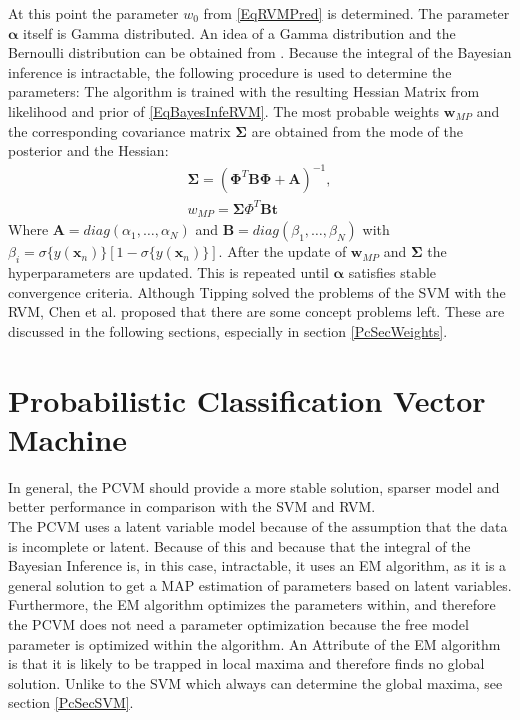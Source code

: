 At this point the parameter $w_0$ from \eqref{EqRVMPred} is determined.
The parameter $\boldsymbol{\alpha}$ itself is Gamma distributed.\cite[p. 214-215, 218-219]{Tipping.2001}\newline
An idea of a Gamma distribution and the Bernoulli distribution can be obtained from \cite[p.686-688]{Bishop.2009}.\newline
Because the integral of the Bayesian inference is intractable, the following procedure is used to determine the parameters:
The algorithm is trained with the resulting Hessian Matrix from likelihood and prior of \ref{EqBayesInfeRVM}.
The most probable weights $\mathbf{w}_{MP}$ and the corresponding covariance matrix $\boldsymbol{\Sigma}$ are obtained from the mode of the posterior and the Hessian:
\begin{equation}
\begin{split}
\boldsymbol{\Sigma} = (\boldsymbol{\Phi}^T\mathbf{B}\boldsymbol{\Phi} + \mathbf{A})^{-1},\\
w_{MP}=\boldsymbol{\Sigma}\Phi^T\mathbf{B}\mathbf{t} 
\end{split}
\end{equation}
Where $\mathbf{A} = diag(\alpha_1,\dots,\alpha_N)$ and $\mathbf{B} = diag(\beta_1,\dots,\beta_N)$ with $\beta_i =\sigma\{y(\mathbf{x}_n)\}[1-\sigma\{y(\mathbf{x}_n)\}]$.
After the update of $\mathbf{w}_{MP}$ and $\boldsymbol{\Sigma}$ the hyperparameters are updated.
This is repeated until $\boldsymbol{\alpha}$ satisfies stable convergence criteria.\cite[p. 219]{Tipping.2001}\newline
Although Tipping solved the problems of the \ac{SVM} with the \ac{RVM}, Chen et al. proposed that there are some concept problems left.\cite{Chen.2009}
These are discussed in the following sections, especially in section \ref{PcSecWeights}.
\section{Probabilistic Classification Vector Machine}\label{PcSecAdvan}
In general, the \acf{PCVM} should provide a more stable solution, sparser model and better performance in comparison with the \acs{SVM} and \acs{RVM}.\cite{Chen.2009}\\
The \ac{PCVM} uses a latent variable model because of the assumption that the data is incomplete or latent.
Because of this and because that the integral of the Bayesian Inference is, in this case, intractable, it uses an \ac{EM} algorithm, as it is a general solution to get a \ac{MAP} estimation of parameters based on latent variables.
Furthermore, the \acs{EM} algorithm optimizes the parameters within, and therefore the \ac{PCVM} does not need a parameter optimization because the free model parameter is optimized within the algorithm.\cite{Chen.2009}\newline
An Attribute of the \acs{EM} algorithm is that it is likely to be trapped in local maxima and therefore finds no global solution.\cite{YiWang.2006}
Unlike to the \acs{SVM} which always can determine the global maxima, see section \ref{PcSecSVM}.\newline

